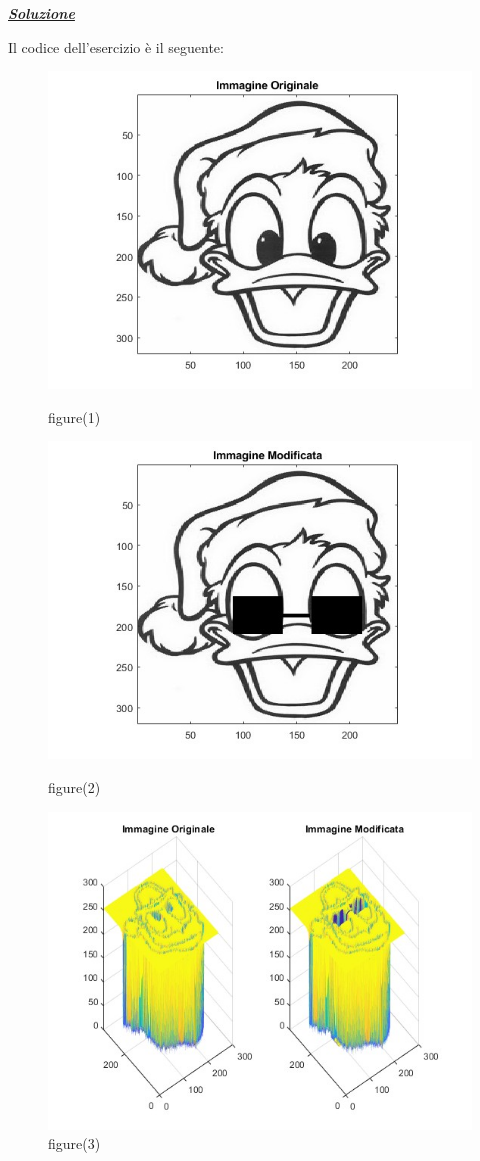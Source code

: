 \documentclass[a4paper]{article}
\begin{document}
	\noindent
	\textcolor{Green4}{\textbf{\underline{\emph{Soluzione}}}}\newline
	
	\noindent
	Il codice dell'esercizio è il seguente:
	\newpage
	
	\begin{figure}[!htp]
		\centering
		\includegraphics[width=.6\textwidth]{img/lab/lab2_ex1-fig1.jpg}
		\caption{\textsf{figure(1)}}
		\:\newline
		\includegraphics[width=.6\textwidth]{img/lab/lab2_ex1-fig2.jpg}
		\caption{\textsf{figure(2)}}
		\:\newline
		\includegraphics[width=.6\textwidth]{img/lab/lab2_ex1-fig3.jpg}
		\caption{\textsf{figure(3)}}
	\end{figure}\newpage
	
\end{document}
